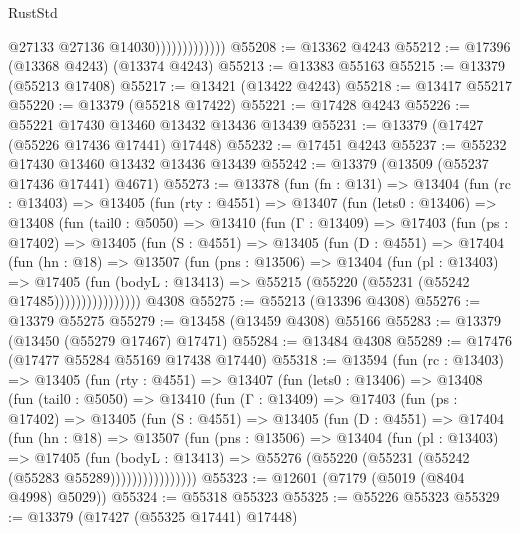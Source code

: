 \begin{lexlean}{RustStd}
\begin{coremodule}
                              @27133
                              @27136
                              @14030)))))))))))))
@55208 := @13362 @4243
@55212 := @17396 (@13368 @4243) (@13374 @4243)
@55213 := @13383 @55163
@55215 := @13379 (@55213 @17408)
@55217 := @13421 (@13422 @4243)
@55218 := @13417 @55217
@55220 := @13379 (@55218 @17422)
@55221 := @17428 @4243
@55226 := @55221 @17430 @13460 @13432 @13436 @13439
@55231 := @13379 (@17427 (@55226 @17436 @17441) @17448)
@55232 := @17451 @4243
@55237 := @55232 @17430 @13460 @13432 @13436 @13439
@55242 := @13379 (@13509 (@55237 @17436 @17441) @4671)
@55273 := @13378
    (fun (fn : @131) =>
    @13404
      (fun (rc : @13403) =>
      @13405
        (fun (rty : @4551) =>
        @13407
          (fun (lets0 : @13406) =>
          @13408
            (fun (tail0 : @5050) =>
            @13410
              (fun (Γ : @13409) =>
              @17403
                (fun (ps : @17402) =>
                @13405
                  (fun (S : @4551) =>
                  @13405
                    (fun (D : @4551) =>
                    @17404
                      (fun (hn : @18) =>
                      @13507
                        (fun (pns : @13506) =>
                        @13404
                          (fun (pl : @13403) =>
                          @17405
                            (fun (bodyL : @13413) =>
                            @55215 (@55220 (@55231 (@55242 @17485))))))))))))))))
    @4308
@55275 := @55213 (@13396 @4308)
@55276 := @13379 @55275
@55279 := @13458 (@13459 @4308) @55166
@55283 := @13379 (@13450 (@55279 @17467) @17471)
@55284 := @13484 @4308
@55289 := @17476 (@17477 @55284 @55169 @17438 @17440)
@55318 := @13594
    (fun (rc : @13403) =>
    @13405
      (fun (rty : @4551) =>
      @13407
        (fun (lets0 : @13406) =>
        @13408
          (fun (tail0 : @5050) =>
          @13410
            (fun (Γ : @13409) =>
            @17403
              (fun (ps : @17402) =>
              @13405
                (fun (S : @4551) =>
                @13405
                  (fun (D : @4551) =>
                  @17404
                    (fun (hn : @18) =>
                    @13507
                      (fun (pns : @13506) =>
                      @13404
                        (fun (pl : @13403) =>
                        @17405
                          (fun (bodyL : @13413) =>
                          @55276 (@55220 (@55231 (@55242 (@55283 @55289))))))))))))))))
@55323 := @12601 (@7179 (@5019 (@8404 @4998) @5029))
@55324 := @55318 @55323
@55325 := @55226 @55323
@55329 := @13379 (@17427 (@55325 @17441) @17448)

\end{coremodule}
\end{lexlean}
